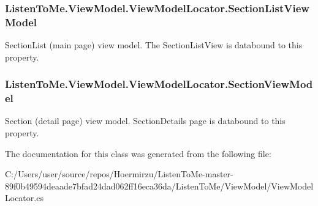 \subsubsection[{\texorpdfstring{Section\+List\+View\+Model}{SectionListViewModel}}]{ Listen\+To\+Me.\+View\+Model.\+View\+Model\+Locator.\+Section\+List\+View\+Model\hspace{0.3cm}{\ttfamily [get]}}\hypertarget{class_listen_to_me_1_1_view_model_1_1_view_model_locator_afc24088b98a0ad7f3b8e7f1afd70b80f}{}\label{class_listen_to_me_1_1_view_model_1_1_view_model_locator_afc24088b98a0ad7f3b8e7f1afd70b80f}


Section\+List (main page) view model. The Section\+List\+View is databound to this property. 

\subsubsection[{\texorpdfstring{Section\+View\+Model}{SectionViewModel}}]{ Listen\+To\+Me.\+View\+Model.\+View\+Model\+Locator.\+Section\+View\+Model\hspace{0.3cm}{\ttfamily [get]}}\hypertarget{class_listen_to_me_1_1_view_model_1_1_view_model_locator_ac631670f442882ee7070273fb72d48d1}{}\label{class_listen_to_me_1_1_view_model_1_1_view_model_locator_ac631670f442882ee7070273fb72d48d1}


Section (detail page) view model. Section\+Details page is databound to this property. 



The documentation for this class was generated from the following file\+:\begin{DoxyCompactItemize}
\item 
C\+:/\+Users/user/source/repos/\+Hoermirzu/\+Listen\+To\+Me-\/master-\/89f0b49594deaade7bfad24dad062ff16eca36da/\+Listen\+To\+Me/\+View\+Model/View\+Model\+Locator.\+cs\end{DoxyCompactItemize}
